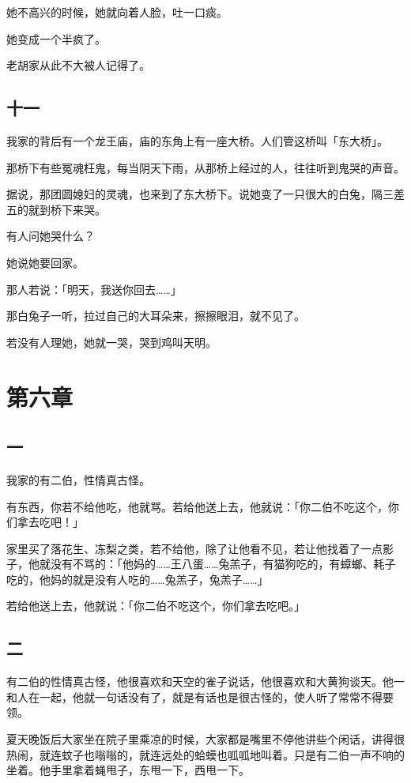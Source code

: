 \documentclass[UTF8]{ctexart}
\begin{document}
她不高兴的时候，她就向着人脸，吐一口痰。

她变成一个半疯了。

{老胡家从此不大被人记得了}。

\subsection{十一}

我家的背后有一个龙王庙，庙的东角上有一座大桥。人们管这桥叫「东大桥」。

那桥下有些冤魂枉鬼，每当阴天下雨，从那桥上经过的人，往往听到鬼哭的声音。

据说，那团圆媳妇的灵魂，也来到了东大桥下。说她变了一只很大的白兔，隔三差五的就到桥下来哭。

有人问她哭什么？

她说她要回家。

那人若说：「明天，我送你回去……」

那白兔子一听，拉过自己的大耳朵来，擦擦眼泪，就不见了。

若没有人理她，她就一哭，哭到鸡叫天明。

\section{第六章}

\subsection{一}

我家的有二伯，性情真古怪。

有东西，你若不给他吃，他就骂。若给他送上去，他就说：「你二伯不吃这个，你们拿去吃吧！」

家里买了落花生、冻梨之类，若不给他，除了让他看不见，若让他找着了一点影子，他就没有不骂的：「他妈的……王八蛋……兔羔子，有猫狗吃的，有蟑螂、耗子吃的，他妈的就是没有人吃的……兔羔子，兔羔子……」

若给他送上去，他就说：「你二伯不吃这个，你们拿去吃吧。」

\subsection{二}

有二伯的性情真古怪，他很喜欢和天空的雀子说话，他很喜欢和大黄狗谈天。他一和人在一起，他就一句话没有了，就是有话也是很古怪的，使人听了常常不得要领。

夏天晚饭后大家坐在院子里乘凉的时候，大家都是嘴里不停他讲些个闲话，讲得很热闹，就连蚊子也嗡嗡的，就连远处的蛤蟆也呱呱地叫着。只是有二伯一声不响的坐着。他手里拿着蝇甩子，东甩一下，西甩一下。
\end{document}
